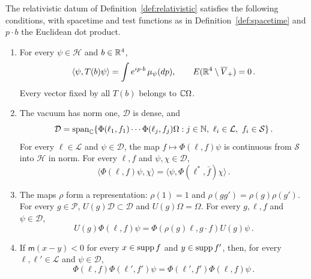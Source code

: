 \begin{definition}\label{def:wightman}
The relativistic datum of Definition~\ref{def:relativistic} satisfies the following conditions, with spacetime and test functions as in Definition~\ref{def:spacetime} and $p\cdot b$ the Euclidean dot product.
\begin{enumerate}[label=\textup{W\arabic*.},ref=W\arabic*,start=0]
\item\label{wightman:0} For every $\psi\in\mathcal H$ and $b\in\mathbb R^4$,
\begin{equation}\label{eq:spectrum}
\langle\psi,T(b)\psi\rangle=\int e^{ip\cdot b}\,\mu_\psi(dp),
\qquad E(\mathbb R^4\setminus\overline V_+)=0\,.
\end{equation}
Every vector fixed by all $T(b)$ belongs to $\mathbb C\Omega$.
\item\label{wightman:1} The vacuum has norm one, $\mathcal D$ is dense, and
\begin{equation}\label{eq:domain}
\mathcal D=\Span_{\C}\{\Phi(\ell_1,f_1)\cdots\Phi(\ell_j,f_j)\Omega:j\in\N,\ \ell_i\in\mathcal L,\ f_i\in\mathcal S\}\,.
\end{equation}
For every $\ell\in\mathcal L$ and $\psi\in\mathcal D$, the map $f\mapsto\Phi(\ell,f)\psi$ is continuous from $\mathcal S$ into $\mathcal H$ in norm.
For every $\ell,f$ and $\psi,\chi\in\mathcal D$,
\begin{equation}\label{eq:adjoint}
\langle\Phi(\ell,f)\psi,\chi\rangle=\langle\psi,\Phi(\ell^*,\bar f)\chi\rangle\,.
\end{equation}
\item\label{wightman:2} The maps $\rho$ form a representation: $\rho(1)=1$ and $\rho(gg')=\rho(g)\rho(g')$.
For every $g\in\mathcal P$, $U(g)\mathcal D\subset\mathcal D$ and $U(g)\Omega=\Omega$.
For every $g,\ell,f$ and $\psi\in\mathcal D$,
\begin{equation}\label{eq:covariance}
U(g)\Phi(\ell,f)\psi=\Phi(\rho(g)\ell,g\cdot f)U(g)\psi\,.
\end{equation}
\item\label{wightman:3} If $\mathsf m(x-y)<0$ for every $x\in\operatorname{supp} f$ and $y\in\operatorname{supp} f'$, then, for every $\ell,\ell'\in\mathcal L$ and $\psi\in\mathcal D$,
\begin{equation}\label{eq:locality}
\Phi(\ell,f)\Phi(\ell',f')\psi=\Phi(\ell',f')\Phi(\ell,f)\psi\,.
\end{equation}
\end{enumerate}
\end{definition}

